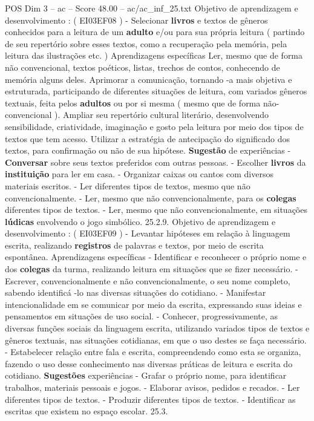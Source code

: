 \begin{textsample}{POS Dim 3 – ac – Score 48.00 – ac/ac\_inf\_25.txt}
Objetivo de aprendizagem e desenvolvimento : ( EI03EF08 ) - Selecionar \textbf{livros} e textos de gêneros conhecidos para a leitura de um \textbf{adulto} e/ou para sua própria leitura ( partindo de seu repertório sobre esses textos, como a recuperação pela memória, pela leitura das ilustrações etc. ) Aprendizagens específicas Ler, mesmo que de forma não convencional, textos poéticos, listas, trechos de contos, conhecendo de memória alguns deles.
Aprimorar a comunicação, tornando -a mais objetiva e estruturada, participando de diferentes situações de leitura, com variados gêneros textuais, feita pelos \textbf{adultos} ou por si mesma ( mesmo que de forma não-convencional ).
Ampliar seu repertório cultural literário, desenvolvendo sensibilidade, criatividade, imaginação e gosto pela leitura por meio dos tipos de textos que tem acesso.
Utilizar a estratégia de antecipação do significado dos textos, para confirmação ou não de sua hipótese. \textbf{Sugestão} de experiências - \textbf{Conversar} sobre seus textos preferidos com outras pessoas. - Escolher \textbf{livros} da \textbf{instituição} para ler em casa. - Organizar caixas ou cantos com diversos materiais escritos. - Ler diferentes tipos de textos, mesmo que não convencionalmente. - Ler, mesmo que não convencionalmente, para os \textbf{colegas} diferentes tipos de textos. - Ler, mesmo que não convencionalmente, em situações \textbf{lúdicas} envolvendo o jogo simbólico. 25.2.9.
Objetivo de aprendizagem e desenvolvimento : ( EI03EF09 ) - Levantar hipóteses em relação à linguagem escrita, realizando \textbf{registros} de palavras e textos, por meio de escrita espontânea.
Aprendizagens específicas - Identificar e reconhecer o próprio nome e dos \textbf{colegas} da turma, realizando leitura em situações que se fizer necessário. - Escrever, convencionalmente e não convencionalmente, o seu nome completo, sabendo identificá -lo nas diversas situações do cotidiano. - Manifestar intencionalidade em se comunicar por meio da escrita, expressando suas ideias e pensamentos em situações de uso social. - Conhecer, progressivamente, as diversas funções sociais da linguagem escrita, utilizando variados tipos de textos e gêneros textuais, nas situações cotidianas, em que o uso destes se faça necessário. - Estabelecer relação entre fala e escrita, compreendendo como esta se organiza, fazendo o uso desse conhecimento nas diversas práticas de leitura e escrita do cotidiano. \textbf{Sugestões} experiências - Grafar o próprio nome, para identificar trabalhos, materiais pessoais e jogos. - Elaborar avisos, pedidos e recados. - Ler diferentes tipos de textos. - Produzir diferentes tipos de textos. - Identificar as escritas que existem no espaço escolar. 25.3.

\end{textsample}
